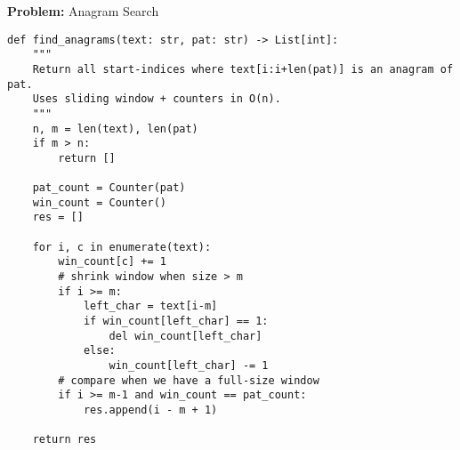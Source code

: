 \noindent\textbf{Problem:} Anagram Search
\begin{verbatim}
def find_anagrams(text: str, pat: str) -> List[int]:
    """
    Return all start-indices where text[i:i+len(pat)] is an anagram of pat.
    Uses sliding window + counters in O(n).
    """
    n, m = len(text), len(pat)
    if m > n:
        return []

    pat_count = Counter(pat)
    win_count = Counter()
    res = []

    for i, c in enumerate(text):
        win_count[c] += 1
        # shrink window when size > m
        if i >= m:
            left_char = text[i-m]
            if win_count[left_char] == 1:
                del win_count[left_char]
            else:
                win_count[left_char] -= 1
        # compare when we have a full-size window
        if i >= m-1 and win_count == pat_count:
            res.append(i - m + 1)

    return res
\end{verbatim}
% 
